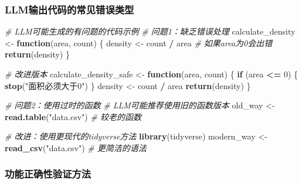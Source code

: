 \documentclass[
  twoside]{book}
\newenvironment{Shaded}{\begin{snugshade}}{\end{snugshade}}
\newcommand{\CommentTok}[1]{\textcolor[rgb]{0.56,0.35,0.01}{\textit{#1}}}
\newcommand{\ControlFlowTok}[1]{\textcolor[rgb]{0.13,0.29,0.53}{\textbf{#1}}}
\newcommand{\DecValTok}[1]{\textcolor[rgb]{0.00,0.00,0.81}{#1}}
\newcommand{\FunctionTok}[1]{\textcolor[rgb]{0.13,0.29,0.53}{\textbf{#1}}}
\newcommand{\NormalTok}[1]{#1}
\newcommand{\OtherTok}[1]{\textcolor[rgb]{0.56,0.35,0.01}{#1}}
\newcommand{\SpecialCharTok}[1]{\textcolor[rgb]{0.81,0.36,0.00}{\textbf{#1}}}
\newcommand{\StringTok}[1]{\textcolor[rgb]{0.31,0.60,0.02}{#1}}
\begin{document}
\hypertarget{llmux8f93ux51faux4ee3ux7801ux7684ux5e38ux89c1ux9519ux8befux7c7bux578b}{%
\subsubsection{LLM输出代码的常见错误类型}\label{llmux8f93ux51faux4ee3ux7801ux7684ux5e38ux89c1ux9519ux8befux7c7bux578b}}

\begin{Shaded}
\begin{Highlighting}[]
\CommentTok{\# LLM可能生成的有问题的代码示例}
\CommentTok{\# 问题1：缺乏错误处理}
\NormalTok{calculate\_density }\OtherTok{\textless{}{-}} \ControlFlowTok{function}\NormalTok{(area, count) \{}
\NormalTok{  density }\OtherTok{\textless{}{-}}\NormalTok{ count }\SpecialCharTok{/}\NormalTok{ area  }\CommentTok{\# 如果area为0会出错}
  \FunctionTok{return}\NormalTok{(density)}
\NormalTok{\}}

\CommentTok{\# 改进版本}
\NormalTok{calculate\_density\_safe }\OtherTok{\textless{}{-}} \ControlFlowTok{function}\NormalTok{(area, count) \{}
  \ControlFlowTok{if}\NormalTok{ (area }\SpecialCharTok{\textless{}=} \DecValTok{0}\NormalTok{) \{}
    \FunctionTok{stop}\NormalTok{(}\StringTok{"面积必须大于0"}\NormalTok{)}
\NormalTok{  \}}
\NormalTok{  density }\OtherTok{\textless{}{-}}\NormalTok{ count }\SpecialCharTok{/}\NormalTok{ area}
  \FunctionTok{return}\NormalTok{(density)}
\NormalTok{\}}

\CommentTok{\# 问题2：使用过时的函数}
\CommentTok{\# LLM可能推荐使用旧的函数版本}
\NormalTok{old\_way }\OtherTok{\textless{}{-}} \FunctionTok{read.table}\NormalTok{(}\StringTok{"data.csv"}\NormalTok{)  }\CommentTok{\# 较老的函数}

\CommentTok{\# 改进：使用更现代的tidyverse方法}
\FunctionTok{library}\NormalTok{(tidyverse)}
\NormalTok{modern\_way }\OtherTok{\textless{}{-}} \FunctionTok{read\_csv}\NormalTok{(}\StringTok{"data.csv"}\NormalTok{)  }\CommentTok{\# 更简洁的语法}
\end{Highlighting}
\end{Shaded}

\hypertarget{ux529fux80fdux6b63ux786eux6027ux9a8cux8bc1ux65b9ux6cd5}{%
\subsubsection{功能正确性验证方法}\label{ux529fux80fdux6b63ux786eux6027ux9a8cux8bc1ux65b9ux6cd5}}
\end{document}
